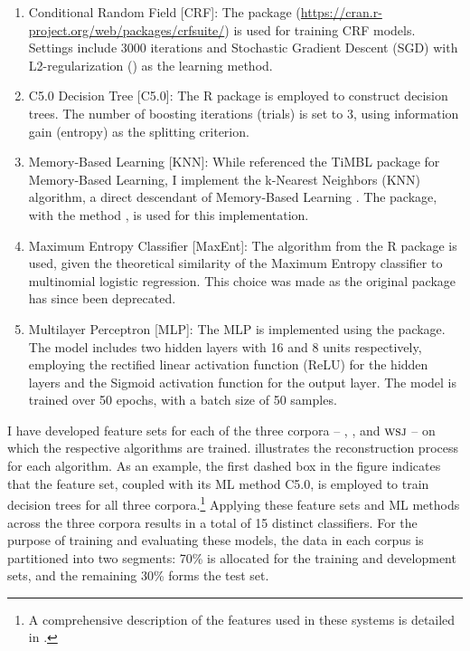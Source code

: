 \begin{enumerate}
	\item Conditional Random Field [CRF]: The  package (\url{https://cran.r-project.org/web/packages/crfsuite/}) is used for training CRF models. Settings include 3000 iterations and Stochastic Gradient Descent (SGD) with L2-regularization () as the learning method.
	\item C5.0 Decision Tree [C5.0]: The  R package \citep{kuhn2018package} is employed to construct decision trees. The number of boosting iterations (trials) is set to 3, using information gain (entropy) as the splitting criterion.
	\item Memory-Based Learning [KNN]: While \citet{hendrickx2008cnts} referenced the TiMBL package \citep{daelemans2007timbl} for Memory-Based Learning, I implement the k-Nearest Neighbors (KNN) algorithm, a direct descendant of Memory-Based Learning \citep{daelemans2007timbl}. The  package, with the method , is used for this implementation.
	\item Maximum Entropy Classifier [MaxEnt]: The  algorithm from the  R
	package is used, given the theoretical similarity of the Maximum Entropy classifier to multinomial logistic regression. This choice was made as the original  package has since been deprecated.
	\item Multilayer Perceptron [MLP]: The MLP is implemented using the  package. The model includes two hidden layers with 16 and 8 units respectively, employing the rectified linear activation function (ReLU) for the hidden layers and the Sigmoid activation function for the output layer. The model is trained over 50 epochs, with a batch size of 50 samples.
\end{enumerate}



I have developed feature sets for each of the three corpora -- \msrcor, \negcor, and $\textsc{wsj}$ -- on which the respective algorithms are trained.  illustrates the reconstruction process for each algorithm. As an example, the first dashed box in the figure indicates that the  feature set, coupled with its ML method C5.0, is employed to train decision trees for all three corpora.\footnote{A comprehensive description of the features used in these systems is detailed in .} Applying these feature sets and ML methods across the three corpora results in a total of 15 distinct classifiers. For the purpose of training and evaluating these models, the data in each corpus is partitioned into two segments: 70\% is allocated for the training and development sets, and the remaining 30\% forms the test set. 

